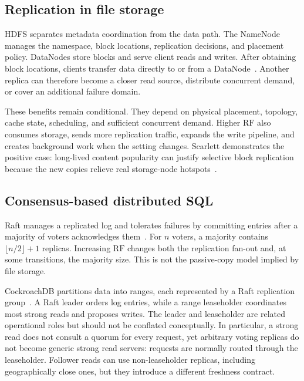 \documentclass[a4paper,10pt,twocolumn]{article}
\newcommand{\rf}{\ensuremath{\mathrm{RF}}}
\newcommand{\cockroach}{CockroachDB}
\newcommand{\hdfs}{HDFS}
\begin{document}
\subsection{Replication in file storage}

\hdfs{} separates metadata coordination from the data path. The NameNode
manages the namespace, block locations, replication decisions, and placement
policy. DataNodes store blocks and serve client reads and writes. After
obtaining block locations, clients transfer data directly to or from a
DataNode~\citep{shvachko2010hdfs}. Another replica can therefore become a
closer read source, distribute concurrent demand, or cover an additional
failure domain.

These benefits remain conditional. They depend on physical placement,
topology, cache state, scheduling, and sufficient concurrent demand. Higher
\rf{} also consumes storage, sends more replication traffic, expands the write
pipeline, and creates background work when the setting changes. Scarlett
demonstrates the positive case: long-lived content popularity can justify
selective block replication because the new copies relieve real storage-node
hotspots~\citep{ananthanarayanan2011scarlett}.

\subsection{Consensus-based distributed SQL}

Raft manages a replicated log and tolerates failures by committing entries
after a majority of voters acknowledges them~\citep{ongaro2014raft}. For
\(n\) voters, a majority contains
\(\lfloor n/2 \rfloor + 1\) replicas. Increasing \rf{} changes both the
replication fan-out and, at some transitions, the majority size. This is not
the passive-copy model implied by file storage.

\cockroach{} partitions data into ranges, each represented by a Raft
replication group~\citep{taft2020cockroach}. A Raft leader orders log entries,
while a range leaseholder coordinates most strong reads and proposes writes.
The leader and leaseholder are related operational roles but should not be
conflated conceptually. In particular, a strong read does not consult a quorum
for every request, yet arbitrary voting replicas do not become generic strong
read servers: requests are normally routed through the leaseholder. Follower
reads can use non-leaseholder replicas, including geographically close ones,
but they introduce a different freshness contract.
\end{document}
